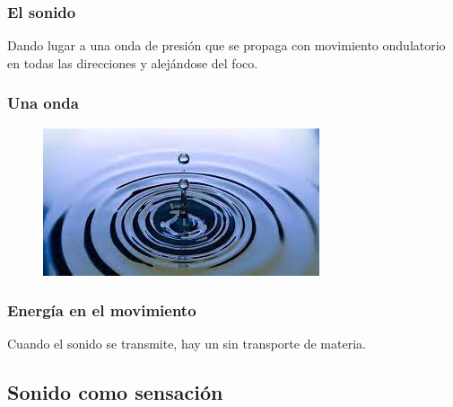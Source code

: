 \documentclass[14pt]{beamer}
\begin{document}
\begin{frame}
\frametitle{El sonido}
Dando lugar a una onda de presión que se propaga con movimiento ondulatorio en todas las direcciones y alejándose del foco. 
\end{frame}
\begin{frame}
\frametitle{Una onda}
\begin{figure}
\centering
\includegraphics[scale=0.7]{Imagenes/Ondas_04.png}
\end{figure}
\end{frame}
\begin{frame}
\frametitle{Energía en el movimiento}
Cuando el sonido se transmite, hay un  sin transporte de materia.
\end{frame}

\subsection{Sonido como sensación}
\end{document}
